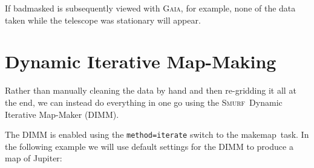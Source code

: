 \documentclass[twoside,11pt]{article}
\newcommand{\gaia}{\xref{\textsc{Gaia}}{sun214}{}}
\newcommand{\smurf}{\xref{\textsc{Smurf}}{sun258}{}}
\newcommand{\task}[1]{\textsf{#1}}
\newcommand{\makemap}{\xref{\task{makemap}}{sun258}{MAKEMAP}}
\newcommand{\xref}[3]{#1}
\newcommand{\xlabel}[1]{}
\renewcommand{\_}{\texttt{\symbol{95}}}
\begin{document}
If badmasked is subsequently viewed with \gaia, for example, none of
the data taken while the telescope was stationary will appear.

\section{\xlabel{maps}Dynamic Iterative Map-Making} 
\label{sec:maps}

Rather than manually cleaning the data by hand and then re-gridding it
all at the end, we can instead do everything in one go using the
\smurf\ Dynamic Iterative Map-Maker (DIMM).

The DIMM is enabled using the \texttt{method=iterate} switch to the
\makemap\ task. In the following example we will use default settings
for the DIMM to produce a map of Jupiter:
\end{document}
